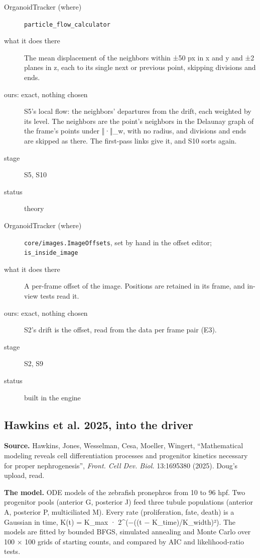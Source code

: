 \begin{description}
\item[{OrganoidTracker (where)}] \texttt{particle\_\allowbreak{}flow\_\allowbreak{}calculator}
\item[{what it does there}] The mean displacement of the neighbors within ±50 px in x and y and ±2 planes in z, each to its single next or previous point, skipping divisions and ends.
\item[{ours: exact, nothing chosen}] S5's local flow: the neighbors' departures from the drift, each weighted by its level. The neighbors are the point's neighbors in the Delaunay graph of the frame's points under ‖·‖\_\allowbreak{}w, with no radius, and divisions and ends are skipped as there. The first-pass links give it, and S10 sorts again.
\item[{stage}] S5, S10
\item[{status}] theory
\end{description}

\begin{description}
\item[{OrganoidTracker (where)}] \texttt{core/\allowbreak{}images.\allowbreak{}Image\allowbreak{}Offsets}, set by hand in the offset editor; \texttt{is\_\allowbreak{}inside\_\allowbreak{}image}
\item[{what it does there}] A per-frame offset of the image. Positions are retained in its frame, and in-view tests read it.
\item[{ours: exact, nothing chosen}] S2's drift is the offset, read from the data per frame pair (E3).
\item[{stage}] S2, S9
\item[{status}] built in the engine
\end{description}

\subsection{\texorpdfstring{Hawkins et al. 2025, into the driver}{Hawkins et al. 2025, into the driver}}

\textbf{Source.} Hawkins, Jones, Wesselman, Cesa, Moeller, Wingert, “Mathematical modeling reveals cell differentiation processes and progenitor kinetics necessary for proper nephrogenesis”, \emph{Front. Cell Dev. Biol.} 13:1695380 (2025). Doug's upload, read.

\textbf{The model.} ODE models of the zebrafish pronephros from 10 to 96 hpf. Two progenitor pools (anterior G, posterior J) feed three tubule populations (anterior A, posterior P, multiciliated M). Every rate (proliferation, fate, death) is a Gaussian in time, K(t) = K\_\allowbreak{}max · 2\textasciicircum{}(−((t − K\_\allowbreak{}time)/K\_\allowbreak{}width)²). The models are fitted by bounded BFGS, simulated annealing and Monte Carlo over 100 × 100 grids of starting counts, and compared by AIC and likelihood-ratio tests.

